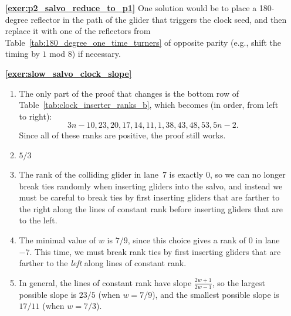 \begin{multicols}{2}
\begin{itemize}[leftmargin=0em]
\begin{enumerate}[leftmargin=1.5em,label=\bf\color{ocre}(\alph*)]
		\item {} \\
		
		\item {} \\
	\end{enumerate}


	\item[\bf\color{ocre}\sffamily\ref{exer:p2_salvo_reduce_to_p1}] One solution would be to place a 180-degree reflector in the path of the glider that triggers the clock seed, and then replace it with one of the reflectors from Table~\ref{tab:180_degree_one_time_turners} of opposite parity (e.g., shift the timing by $1$ mod $8$) if necessary.\\
	
	
	\item[\bf\color{ocre}\sffamily\ref{exer:slow_salvo_clock_slope}]
	\begin{enumerate}[leftmargin=1.5em,label=\bf\color{ocre}(\alph*)]
		\item The only part of the proof that changes is the bottom row of Table~\ref{tab:clock_inserter_ranks_b}, which becomes (in order, from left to right): $$3n-10, 23, 20, 17, 14, 11, 1, 38, 43, 48, 53, 5n-2.$$ Since all of these ranks are positive, the proof still works. \\
		
		\item $5/3$ \\
		
		\item The rank of the colliding glider in lane~7 is exactly $0$, so we can no longer break ties randomly when inserting gliders into the salvo, and instead we must be careful to break ties by first inserting gliders that are farther to the right along the lines of constant rank before inserting gliders that are to the left. \\
		
		\item The minimal value of $w$ is $7/9$, since this choice gives a rank of $0$ in lane $-7$. This time, we must break rank ties by first inserting gliders that are farther to the \emph{left} along lines of constant rank. \\
		
		\item In general, the lines of constant rank have slope $\frac{2w+1}{2w-1}$, so the largest possible slope is $23/5$ (when $w = 7/9$), and the smallest possible slope is $17/11$ (when $w = 7/3$). \\
	\end{enumerate}



\end{itemize}
\end{multicols}
